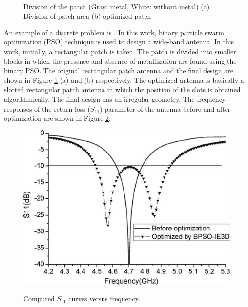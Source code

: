 \begin{figure}
  \centering
  ~~~~~~~~~~~~~~~~~~~~~
  \\
  \caption [Division of the patch (Dark: metal, White: without metal) (a) Division of patch area (b) optimized patch]{Division of the patch (Gray: metal, White: without metal) (a) Division of patch area (b) optimized patch \cite{optPatch}} \label{fig_2_2}
\end{figure}

An example of a discrete problem is \cite{optPatch}. In this work, binary particle swarm optimization (PSO) technique is used to design a wide-band antenna. In this work, initially, a rectangular patch is taken. The patch is divided into smaller blocks in which the presence and absence of metallization are found using the binary PSO. The original rectangular patch antenna and the final design are shown in Figure \ref{fig_2_2} (a) and (b) respectively. The optimized antenna is basically a slotted rectangular patch antenna in which the position of the slots is obtained algorithmically. The final design has an irregular geometry. The frequency responses of the return loss ($S_{11}$) parameter of the antenna before and after optimization are shown in Figure \ref{fig_2_3}.

\begin{figure}
  \centering
  \includegraphics[width=0.6\linewidth]{fig_2_3.eps}\\
  \caption [Computed $S_{11}$ curves versus frequency]{Computed $S_{11}$ curves versus frequency. \cite{patch_miniaturize_ga}} \label{fig_2_3}
\end{figure}

